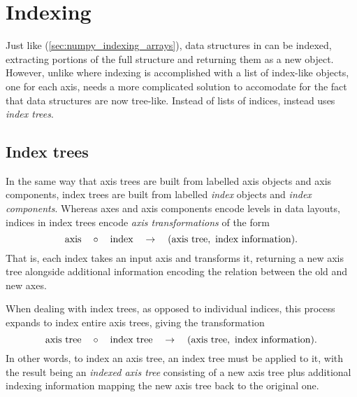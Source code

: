 \documentclass[thesis]{subfiles}
\begin{document}
\chapter{Indexing}
\label{chapter:indexing}

Just like \numpy{} (\cref{sec:numpy_indexing_arrays}), data structures in  can be indexed, extracting portions of the full structure and returning them as a new object.
However, unlike \numpy{} where indexing is accomplished with a list of index-like objects, one for each axis,  needs a more complicated solution to accomodate for the fact that data structures are now tree-like.
Instead of lists of indices,  instead uses \emph{index trees}.

\section{Index trees}
\label{sec:index_trees}

In the same way that axis trees are built from labelled axis objects and axis components, index trees are built from labelled \emph{index} objects and \emph{index components}.
Whereas axes and axis components encode levels in data layouts, indices in index trees encode \emph{axis transformations} of the form
\begin{equation}
  \textnormal{axis} \quad \circ \quad \textnormal{index} \quad \to \quad (\textnormal{axis tree},\ \textnormal{index information}).
  \label{eq:index_transform}
\end{equation}
That is, each index takes an input axis and transforms it, returning a new axis tree alongside additional information encoding the relation between the old and new axes.

When dealing with index trees, as opposed to individual indices, this process expands to index entire axis trees, giving the transformation
\begin{equation}
  \label{eq:index_tree_apply}
  \textnormal{axis tree} \quad \circ \quad \textnormal{index tree} \quad \to \quad (\textnormal{axis tree},\ \textnormal{index information}).
\end{equation}
In other words, to index an axis tree, an index tree must be applied to it, with the result being an \emph{indexed axis tree} consisting of a new axis tree plus additional indexing information mapping the new axis tree back to the original one.
\end{document}
